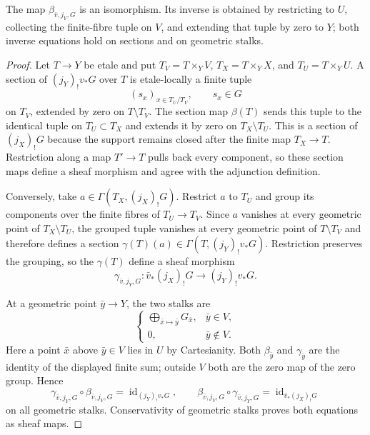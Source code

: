 \begin{lemma}
\label{lemma:weil-pbc-finite-open-comparison-inverse}
The map $\beta_{\bar v,j_Y,G}$ is an isomorphism.  Its inverse is obtained by
restricting to $U$, collecting the finite-fibre tuple on $V$, and extending
that tuple by zero to $Y$; both inverse equations hold on sections and on
geometric stalks.
\end{lemma}
\begin{proof}
Let $T\to Y$ be etale and put
$T_V=T\times_YV$, $T_X=T\times_YX$, and
$T_U=T\times_YU$.  A section of $(j_Y)_!v_*G$ over $T$ is etale-locally a
finite tuple
\[
 (s_x)_{x\in T_U/T_V},\qquad s_x\in G
\]
on $T_V$, extended by zero on $T\setminus T_V$.  The section map
$\beta(T)$ sends this tuple to the identical tuple on $T_U\subset T_X$ and
extends it by zero on $T_X\setminus T_U$.  This is a section of
$(j_X)_!G$ because the support remains closed after the finite map
$T_X\to T$.  Restriction along a map $T'\to T$ pulls back every component,
so these section maps define a sheaf morphism and agree with the
adjunction definition.

Conversely, take
$a\in\Gamma(T_X,(j_X)_!G)$.  Restrict $a$ to $T_U$ and group its components
over the finite fibres of $T_U\to T_V$.  Since $a$ vanishes at every
geometric point of $T_X\setminus T_U$, the grouped tuple vanishes at every
geometric point of $T\setminus T_V$ and therefore defines a section
$\gamma(T)(a)\in\Gamma(T,(j_Y)_!v_*G)$.  Restriction preserves the grouping,
so the $\gamma(T)$ define a sheaf morphism
\[
 \gamma_{\bar v,j_Y,G}:\bar v_*(j_X)_!G\longrightarrow(j_Y)_!v_*G.
\]

At a geometric point $\bar y\to Y$, the two stalks are
\[
\begin{cases}
\displaystyle\bigoplus_{\bar x\mapsto\bar y}G_{\bar x},
   &\bar y\in V,\\[6pt]
0,&\bar y\notin V.
\end{cases}
\]
Here a point $\bar x$ above $\bar y\in V$ lies in $U$ by Cartesianity.
Both $\beta_{\bar y}$ and $\gamma_{\bar y}$ are the identity of the displayed
finite sum; outside $V$ both are the zero map of the zero group.  Hence
\[
 \gamma_{\bar v,j_Y,G}\circ\beta_{\bar v,j_Y,G}
 =\operatorname{id}_{(j_Y)_!v_*G},\qquad
 \beta_{\bar v,j_Y,G}\circ\gamma_{\bar v,j_Y,G}
 =\operatorname{id}_{\bar v_*(j_X)_!G}
\]
on all geometric stalks.  Conservativity of geometric stalks proves both
equations as sheaf maps.
\end{proof}

